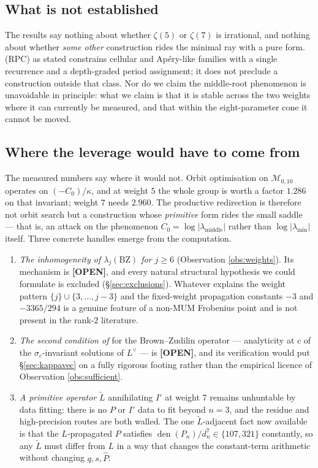 \documentclass[11pt,reqno]{amsart}
\theoremstyle{plain}
\theoremstyle{definition}
\theoremstyle{remark}
\newcommand{\OPEN}{{\normalfont\sffamily\bfseries[OPEN]}}
\DeclareMathOperator{\den}{den}
\newcommand{\Phat}{\widehat{P}}
\newcommand{\Ltilde}{\widetilde{L}}
\begin{document}
\subsection{What is not established}
The results say nothing about whether $\zeta(5)$ or $\zeta(7)$ is irrational, and nothing about
whether \emph{some other} construction rides the minimal ray with a pure form. (RPC) as stated
constrains cellular and Ap\'ery-like families with a single recurrence and a depth-graded period
assignment; it does not preclude a construction outside that class. Nor do we claim the middle-root
phenomenon is unavoidable in principle: what we claim is that it is stable across the two weights
where it can currently be measured, and that within the eight-parameter cone it cannot be moved.

\subsection{Where the leverage would have to come from}
The measured numbers say where it would not. Orbit optimisation on $\mathcal M_{0,10}$ operates
on $(-C_0)/\kappa$, and at weight $5$ the whole group is worth a factor $1.286$ on that invariant;
weight $7$ needs $2.960$. The productive redirection is therefore not orbit search but a
construction whose \emph{primitive} form rides the small saddle --- that is, an attack on the
phenomenon $C_0=\log|\lambda_{\text{middle}}|$ rather than $\log|\lambda_{\min}|$ itself. Three
concrete handles emerge from the computation.
\begin{enumerate}[label=(\roman*),leftmargin=2.2em]
\item \emph{The inhomogeneity of $\lambda_j(\mathrm{BZ})$ for $j\ge6$}
(Observation \ref{obs:weights}). Its mechanism is \OPEN, and every natural structural hypothesis
we could formulate is excluded (\S\ref{sec:exclusions}). Whatever explains the weight pattern
$\{j\}\cup\{3,\dots,j-3\}$ and the fixed-weight propagation constants $-3$ and $-3365/294$ is
a genuine feature of a non-MUM Frobenius point and is not present in the rank-$2$ literature.
\item \emph{The second condition of \cite[Def.~21]{BV}} for the Brown--Zudilin operator ---
analyticity at $c$ of the $\sigma_c$-invariant solutions of $L^\vee$ --- is \OPEN, and its
verification would put \S\ref{sec:kappavec} on a fully rigorous footing rather than the empirical
licence of Observation \ref{obs:sufficient}.
\item \emph{A primitive operator} $\Ltilde$ annihilating $I'$ at weight $7$ remains unhuntable by
data fitting: there is no $P$ or $I'$ data to fit beyond $n=3$, and the residue and
high-precision routes are both walled. The one $\Ltilde$-adjacent fact now available is that the
$L$-propagated $P$ satisfies $\den(P_n)/d_n^7\in\{107,321\}$ constantly, so any $\Ltilde$ must
differ from $L$ in a way that changes the constant-term arithmetic without changing $q,s,\Phat$.
\end{enumerate}
\end{document}
